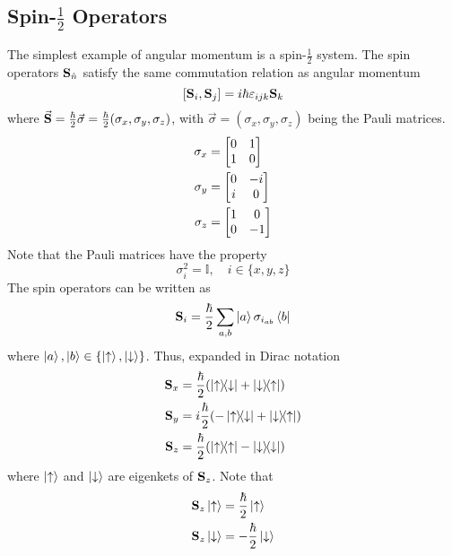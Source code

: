 \documentclass[12pt,a4paper,titlepage]{article}
\newcommand{\up}{\uparrow} %
\newcommand{\dn}{\downarrow} %
\begin{document}
\subsection{Spin-$\frac{1}{2}$ Operators}
The simplest example of angular momentum is a spin-$\frac{1}{2}$ system. The spin operators $\vb{S}_{\hat{n}}$ satisfy the same commutation relation as angular momentum
\begin{equation}
\comm{\vb{S}_{i}}{\vb{S}_{j}}=i\hbar\varepsilon_{ijk}\vb{S}_{k}
\end{equation}
where $\vec{\vb{S}}=\frac{\hbar}{2}\vec{\sigma}=\frac{\hbar}{2}(\sigma_{x},\sigma_{y},\sigma_{z})$, with $\vec{\sigma}=(\sigma_{x},\sigma_{y},\sigma_{z})$ being the Pauli matrices.
\begin{equation}
\begin{aligned}
\sigma_{x}&=\mqty[0 & 1\\ 1&0]\\
\sigma_{y}&=\mqty[0 & -i\\ i & 0]\\
\sigma_{z}&=\mqty[1 & 0\\ 0&-1]
\end{aligned}
\end{equation}
Note that the Pauli matrices have the property
\begin{equation}
\sigma_{i}^{2}=\mathbb{I},\quad i\in\{x,y,z\}
\end{equation}
The spin operators can be written as
\begin{equation}
\vb{S}_{i}=\frac{\hbar}{2}\sum_{a,b}\ket{a}\sigma_{i_{ab}}\bra{b}
\end{equation}
where $\ket{a},\ket{b}\in\{\ket{\up},\ket{\dn}\}$. Thus, expanded in Dirac notation
\begin{equation}
\begin{aligned}
\vb{S}_{x}&=\frac{\hbar}{2}\qty(\op{\up}{\dn}+\op{\dn}{\up})\\
\vb{S}_{y}&=i\frac{\hbar}{2}\qty(-\op{\up}{\dn}+\op{\dn}{\up})\\
\vb{S}_{z}&=\frac{\hbar}{2}\qty(\op{\up}{\up}-\op{\dn}{\dn})
\end{aligned}
\end{equation}
where $\ket{\up}$ and $\ket{\dn}$ are eigenkets of $\vb{S}_{z}$. Note that
\begin{equation}
\begin{aligned}
\vb{S}_{z}\ket{\up}&=\frac{\hbar}{2}\ket{\up}\\
\vb{S}_{z}\ket{\dn}&=-\frac{\hbar}{2}\ket{\dn}
\end{aligned}
\end{equation}
\end{document}

